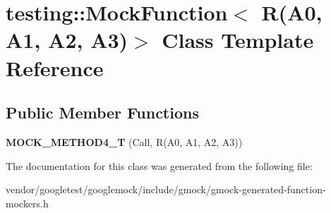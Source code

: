 \hypertarget{classtesting_1_1MockFunction_3_01R_07A0_00_01A1_00_01A2_00_01A3_08_4}{}\section{testing\+:\+:Mock\+Function$<$ R(A0, A1, A2, A3)$>$ Class Template Reference}
\label{classtesting_1_1MockFunction_3_01R_07A0_00_01A1_00_01A2_00_01A3_08_4}
\subsection*{Public Member Functions}
\begin{DoxyCompactItemize}
\item 
{\bfseries M\+O\+C\+K\+\_\+\+M\+E\+T\+H\+O\+D4\+\_\+T} (Call, R(A0, A1, A2, A3))\hypertarget{classtesting_1_1MockFunction_3_01R_07A0_00_01A1_00_01A2_00_01A3_08_4_ad158c25a1b33cb53bae3f0eb9df0d59c}{}\label{classtesting_1_1MockFunction_3_01R_07A0_00_01A1_00_01A2_00_01A3_08_4_ad158c25a1b33cb53bae3f0eb9df0d59c}

\end{DoxyCompactItemize}


The documentation for this class was generated from the following file\+:\begin{DoxyCompactItemize}
\item 
vendor/googletest/googlemock/include/gmock/gmock-\/generated-\/function-\/mockers.\+h\end{DoxyCompactItemize}
